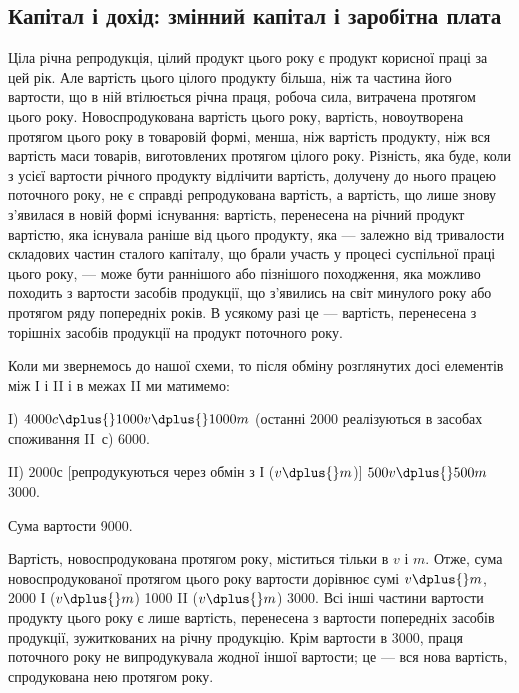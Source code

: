 
\subsection[Капітал і дохід: змінний капітал і заробітна плата]{Капітал і дохід: змінний капітал і заробітна плата\footnotemark{}}

\label{original-338}
\noindent{}Ціла
річна репродукція, цілий продукт цього року є продукт корисної
праці за цей рік. Але вартість цього цілого продукту більша, ніж
та частина його вартости, що в ній втілюється річна праця, робоча
сила, витрачена протягом цього року. Новоспродукована вартість
цього року, вартість, новоутворена протягом цього року в товаровій
формі, менша, ніж вартість продукту, ніж вся вартість маси товарів,
виготовлених протягом цілого року. Різність, яка буде, коли з усієї
вартости річного продукту відлічити вартість, долучену до нього працею
поточного року, не є справді репродукована вартість, а вартість, що лише
знову з’явилася в новій формі існування: вартість, перенесена на річний
продукт вартістю, яка існувала раніше від цього продукту, яка — залежно
від тривалости складових частин сталого капіталу, що брали участь у
процесі суспільної праці цього року, — може бути раннішого або пізнішого
походження, яка можливо походить з вартости засобів продукції,
що з’явились на світ минулого року або протягом ряду попередніх років.
В усякому разі це — вартість, перенесена з торішніх засобів продукції
на продукт поточного року.

Коли ми звернемось до нашої схеми, то після обміну розглянутих досі
елементів між І і II і в межах II ми матимемо:

I) $4000 c \dplus{} 1000 v \dplus{} 1000 m$ (останні 2000 реалізуються в засобах
споживання II~$с$) \deq{} 6000.

II) $2000 с$ [репродукуються через обмін з І ($v \dplus{} m$)] \dplus{} $500 v \dplus{} 500 m$ \deq{} 3000.

Сума вартости \deq{} 9000.

Вартість, новоспродукована протягом року, міститься тільки в $v$ і $m$.
Отже, сума новоспродукованої протягом цього року вартости дорівнює
сумі $v \dplus{} m$, \deq{} 2000 І ($v \dplus{} m$) \dplus{} 1000 II ($v \dplus{} m$) \deq{} 3000. Всі інші частини
вартости продукту цього року є лише вартість, перенесена з вартости
попередніх засобів продукції, зужиткованих на річну продукцію.
Крім вартости в 3000, праця поточного року не випродукувала жодної
іншої вартости; це — вся нова вартість, спродукована нею протягом року.


